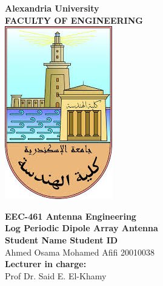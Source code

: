 \documentclass[a4paper, 12pt, english]{article}
\begin{document}
\begin{titlepage}
\begin{center}
\textbf{\LARGE Alexandria University}\\[0.5cm] 
\textbf{\large FACULTY OF ENGINEERING}\\[0.2cm]
\vspace{20pt}
\includegraphics{logo.png}\\[1cm]
\par
\vspace{20pt}
\textbf{\Large EEC-461 Antenna Engineering}\\
\vspace{15pt}
\myrule[1pt][7pt]
\textbf{\LARGE Log Periodic Dipole Array Antenna}\\
\myrule[1pt][7pt]
\vspace{25pt}
\textbf{\large \hspace{50pt}Student Name \hspace{60pt} Student ID}\\
Ahmed Osama Mohamed Afifi \hspace{60pt} 20010038 \\

\vspace{45pt}
\textbf {\large Lecturer in charge:}\\[0.2cm]
\Large {Prof Dr. Said E. El-Khamy}\\[0.1cm]
\end{center}

\par
\vfill
\begin{center}
\end{center}

\end{titlepage}
\end{document}
